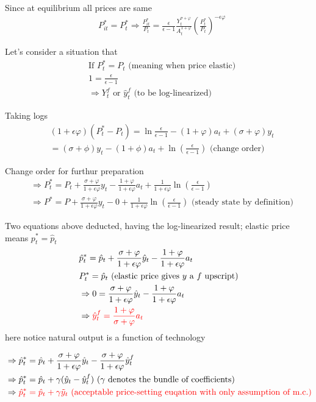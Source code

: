 \documentclass{article}
\begin{document}
Since at equilibrium all prices are same
\begin{align}
& P^{*}_{it}=P_{t}^{*} \Rightarrow \frac{P^{*}_{it}}{P_t}=\frac{\epsilon}{\epsilon-1} \frac{Y_t^{\sigma+\varphi}}{A_t^{1+\varphi}} (\frac{P^*_{t}}{P_t})^{-\epsilon\varphi}
\end{align}

Let's consider a situation that
\begin{align}
& \text{If } P_{t}^{*}=P_t \text{ (meaning when price elastic)} 
\\& 1=\frac{\epsilon}{\epsilon-1}
\\& \Rightarrow Y_t^f \text{ or } \hat y_t^f \text{ (to be log-linearized)}
\end{align}


Taking logs
\begin{align}
& 
(1+\epsilon \varphi)(P^*_t - P_t)=\ln \frac{\epsilon}{\epsilon-1}-(1+\varphi)a_t+(\sigma+\varphi)y_t
\\& = (\sigma+\phi)y_t-(1+\phi)a_t+\ln(\frac{\epsilon}{\epsilon-1}) 
\text{ (change order)}
\end{align}

Change order for furthur preparation
\begin{align}
& \Rightarrow P_t^*=P_t + \frac{\sigma+\varphi}{1+\epsilon\varphi}y_t - \frac{1+\varphi}{1+\epsilon \varphi} a_t+ \frac{1}{1+\epsilon \varphi}\ln (\frac{\epsilon}{\epsilon-1})
\\& \Rightarrow  P^*=P+\frac{\sigma+\varphi}{1+\epsilon\varphi}y_t-0+\frac{1}{1+\epsilon \varphi}\ln (\frac{\epsilon}{\epsilon-1})
\text{ (steady state by definition)}
\end{align}

Two equations above deducted, having the log-linearized result; elastic price means $p_t^*=\hat p_t$
\begin{align}
& \hat p_t^*=\hat p_t + \frac{\sigma+\varphi}{1+\epsilon\varphi} \hat y_t -\frac{1+\varphi}{1+\epsilon\varphi} a_t
\\& P_t^*=\hat p_t \text{ (elastic price gives $y$ a $f$ upscript)}
\\& \Rightarrow 0=\frac{\sigma+\varphi}{1+\epsilon\varphi} \hat y_t -\frac{1+\varphi}{1+\epsilon\varphi} a_t
\\& \Rightarrow \color{red} \hat y_t^f = \frac{1+\varphi}{\sigma+\varphi}a_t
\end{align}
here notice natural output is a function of technology

\begin{align}
& \Rightarrow \hat p_t^*=\hat p_t +\frac{\sigma+\varphi}{1+\epsilon\varphi} \hat y_t-\frac{\sigma+\varphi}{1+\epsilon\varphi} \hat y_t^f
\\& \Rightarrow \hat p_t^*=\hat p_t +\gamma (\hat y_t-\hat y_t^f) \text{ ($\gamma$ denotes the bundle of coefficients)}
\\& \Rightarrow \color{red} \hat p_t^*=\hat p_t +\gamma \tilde y_t \text{ (acceptable price-setting euqation with only assumption of m.c.)} 
\end{align}
\end{document}
